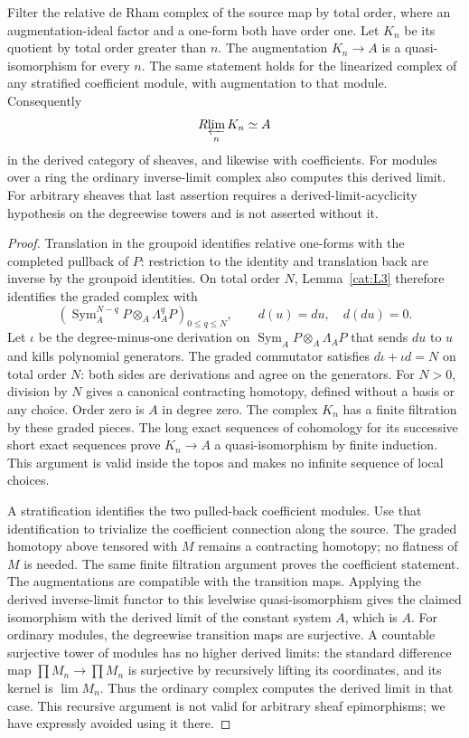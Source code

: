 \begin{proposition}\label{cat:L7}
Filter the relative de Rham complex of the source map by total order,
where an augmentation-ideal factor and a one-form both have order one.
Let $K_n$ be its quotient by total order greater than $n$.
The augmentation $K_n\to A$ is a quasi-isomorphism for every $n$.
The same statement holds for the linearized complex of any stratified
coefficient module, with augmentation to that module.
Consequently
\[
 R\!\varprojlim_n K_n\simeq A
\]
in the derived category of sheaves, and likewise with coefficients.
For modules over a ring the ordinary inverse-limit complex also
computes this derived limit.  For arbitrary sheaves that last assertion
requires a derived-limit-acyclicity hypothesis on the degreewise
towers and is not asserted without it.
\end{proposition}
\begin{proof}
Translation in the groupoid identifies relative one-forms with the
completed pullback of $P$: restriction to the identity and translation
back are inverse by the groupoid identities.  On total order $N$,
Lemma~\ref{cat:L3} therefore identifies the graded complex with
\[
 \left(\operatorname{Sym}_A^{N-q}P\otimes_A\Lambda_A^qP\right)_{0\leq q\leq N},
 \qquad d(u)=du,\quad d(du)=0.
\]
Let $\iota$ be the degree-minus-one derivation on
$\operatorname{Sym}_AP\otimes_A\Lambda_AP$ that sends $du$ to $u$
and kills polynomial generators.  The graded commutator satisfies
$d\iota+\iota d=N$ on total order $N$: both sides are derivations
and agree on the generators.  For $N>0$, division by $N$ gives a
canonical contracting homotopy, defined without a basis or any choice.
Order zero is $A$ in degree zero.
The complex $K_n$ has a finite filtration by these graded pieces.
The long exact sequences of cohomology for its successive short exact
sequences prove $K_n\to A$ a quasi-isomorphism by finite induction.
This argument is valid inside the topos and makes no infinite sequence
of local choices.

A stratification identifies the two pulled-back coefficient modules.
Use that identification to trivialize the coefficient connection along
the source.  The graded homotopy above tensored with $M$ remains a
contracting homotopy; no flatness of $M$ is needed.  The same finite
filtration argument proves the coefficient statement.
The augmentations are compatible with the transition maps.
Applying the derived inverse-limit functor to this levelwise
quasi-isomorphism gives the claimed isomorphism with the derived limit
of the constant system $A$, which is $A$.
For ordinary modules, the degreewise transition maps are surjective.
A countable surjective tower of modules has no higher derived limits:
the standard difference map $\prod M_n\to\prod M_n$ is surjective
by recursively lifting its coordinates, and its kernel is $\lim M_n$.
Thus the ordinary complex computes the derived limit in that case.
This recursive argument is not valid for arbitrary sheaf epimorphisms;
we have expressly avoided using it there.
\end{proof}

